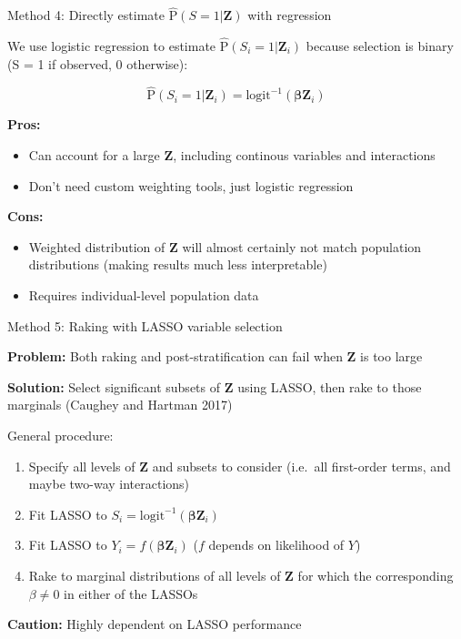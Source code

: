 \documentclass[
  ignorenonframetext,
]{beamer}
\providecommand{\tightlist}{%
  \setlength{\itemsep}{0pt}\setlength{\parskip}{0pt}}
\begin{document}
\begin{frame}{Method 4: Directly estimate
\(\hat{\text{P}}(S = 1| \mathbf{Z})\) with regression}
\protect\hypertarget{method-4-directly-estimate-hattextps-1-mathbfz-with-regression}{}

We use logistic regression to estimate
\(\hat{\text{P}}(S_i = 1 | \mathbf{Z}_i)\) because selection is binary
(S = 1 if observed, 0 otherwise):

\[\hat{\text{P}}(S_i = 1 | \mathbf{Z}_i) = \text{logit}^{-1}(\boldsymbol{\beta}\mathbf{Z}_i)\]

\textbf{Pros:}

\begin{itemize}
\tightlist
\item
  Can account for a large \(\mathbf{Z}\), including continous variables
  and interactions
\item
  Don't need custom weighting tools, just logistic regression
\end{itemize}

\textbf{Cons:}

\begin{itemize}
\tightlist
\item
  Weighted distribution of \(\mathbf{Z}\) will almost certainly not
  match population distributions (making results much less
  interpretable)
\item
  Requires individual-level population data
\end{itemize}

\end{frame}

\begin{frame}{Method 5: Raking with LASSO variable selection}
\protect\hypertarget{method-5-raking-with-lasso-variable-selection}{}

\textbf{Problem:} Both raking and post-stratification can fail when
\(\mathbf{Z}\) is too large

\textbf{Solution:} Select significant subsets of \(\mathbf{Z}\) using
LASSO, then rake to those marginals (Caughey and Hartman 2017)

General procedure:

\begin{enumerate}
\tightlist
\item
  Specify all levels of \(\mathbf{Z}\) and subsets to consider (i.e.~all
  first-order terms, and maybe two-way interactions)
\item
  Fit LASSO to
  \(S_i = \text{logit}^{-1}(\boldsymbol{\beta}\mathbf{Z}_i)\)
\item
  Fit LASSO to \(Y_i = f(\boldsymbol{\beta}\mathbf{Z}_i)\) (\(f\)
  depends on likelihood of \(Y\))
\item
  Rake to marginal distributions of all levels of \(\mathbf{Z}\) for
  which the corresponding \(\beta \neq 0\) in either of the LASSOs
\end{enumerate}

\textbf{Caution:} Highly dependent on LASSO performance

\end{frame}
\end{document}
